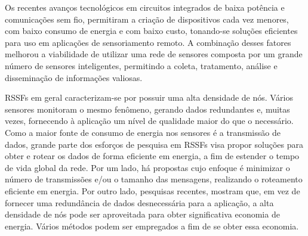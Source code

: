 Os recentes avanços tecnológicos em circuitos integrados de baixa
potência e comunicações sem fio, permitiram a criação de dispositivos
cada vez menores, com baixo consumo de energia e com baixo custo,
tonando-se soluções eficientes para uso em aplicações de sensoriamento
remoto. A combinação desses fatores melhorou a viabilidade de utilizar
uma rede de sensores composta por um grande número de sensores inteligentes,
permitindo a coleta, tratamento, análise e disseminação de informações
valiosas\cite{akyildiz2002}.

RSSFs em geral caracterizam-se por possuir uma alta densidade de nós.
Vários sensores monitoram o mesmo fenômeno, gerando dados redundantes
e, muitas vezes, fornecendo à aplicação um nível de qualidade maior
do que o necessário. Como a maior fonte de consumo de energia nos
sensores é a transmissão de dados, grande parte dos esforços de pesquisa
em RSSFs visa propor soluções para obter e rotear os dados de forma
eficiente em energia, a fim de estender o tempo de vida global da
rede. Por um lado, há propostas cujo enfoque é minimizar o número
de transmissões e/ou o tamanho das mensagens, realizando o roteamento
eficiente em energia\cite{heinzelman2000,intanagonwiwat2000}. Por
outro lado, pesquisas recentes\cite{perillo2003:1,perillo2003:2},
mostram que, em vez de fornecer uma redundância de dados desnecessária
para a aplicação, a alta densidade de nós pode ser aproveitada para
obter significativa economia de energia. Vários métodos podem ser
empregados a fim de se obter essa economia. 

